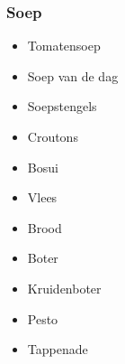 \subsubsection*{Soep}
\begin{itemize}
	\item	Tomatensoep
	\item	Soep van de dag
	\item	Soepstengels
	\item	Croutons
	\item	Bosui
	\item	Vlees
	\item	Brood
	\item	Boter
	\item	Kruidenboter
	\item	Pesto
	\item	Tappenade
\end{itemize}
